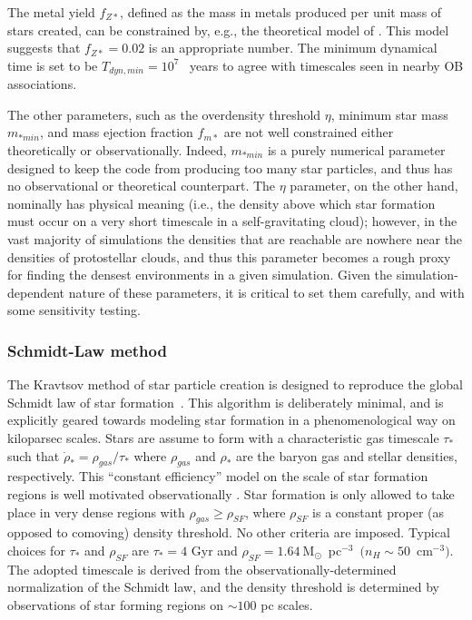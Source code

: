 The metal yield $f_{Z*}$, defined as the mass in metals produced per
unit mass of stars created, can be constrained by, e.g., the
theoretical model of \citet{1995ApJS..101..181W}.  This model suggests
that $f_{Z*} = 0.02$ is an appropriate number.  The minimum dynamical
time is set to be $T_{dyn,min} = 10^7$ ~years to agree with timescales
seen in nearby OB associations.

The other parameters, such as the overdensity threshold $\eta$,
minimum star mass $m_{*min}$, and mass ejection fraction $f_{m*}$ are
not well constrained either theoretically or observationally.  Indeed,
$m_{*min}$ is a purely numerical parameter designed to keep the code
from producing too many star particles, and thus has no observational
or theoretical counterpart.  The $\eta$ parameter, on the other hand,
nominally has physical meaning (i.e., the density above which star
formation must occur on a very short timescale in a self-gravitating
cloud); however, in the vast majority of simulations the densities
that are reachable are nowhere near the densities of protostellar
clouds, and thus this parameter becomes a rough proxy for finding the
densest environments in a given simulation.  Given the
simulation-dependent nature of these parameters, it is critical to set
them carefully, and with some sensitivity testing.

\subsubsection{Schmidt-Law method}
\label{sec:starform_kravtsov}

The Kravtsov method of star particle creation is designed to reproduce
the global Schmidt law of star formation~\citep{2003ApJ...590L...1K,
1959ApJ...129..243S}.  This algorithm is deliberately minimal, and is
explicitly geared towards modeling star formation in a
phenomenological way on kiloparsec scales.  Stars are assume to form
with a characteristic gas timescale $\tau_*$ such that $\dot{\rho}_* =
\rho_{gas}/\tau_*$ where $\rho_{gas}$ and $\rho_*$ are the baryon gas
and stellar densities, respectively.  This ``constant efficiency''
model on the scale of star formation regions is well motivated
observationally \citep{1996AJ....112.1903Y,2002ApJ...569..157W}.  Star
formation is only allowed to take place in very dense regions with
$\rho_{gas} \geq \rho_{SF}$, where $\rho_{SF}$ is a constant proper
(as opposed to comoving) density threshold.  No other criteria are
imposed.  Typical choices for $\tau_*$ and $\rho_{SF}$ are $\tau_* =
4$ Gyr and $\rho_{SF} = 1.64~$M$_\odot$~pc$^{-3}$~$(n_H \sim
50$~cm$^{-3})$.  The adopted timescale is derived from the
observationally-determined normalization of the Schmidt law, and the
density threshold is determined by observations of star forming
regions on $\sim 100$ pc scales.

